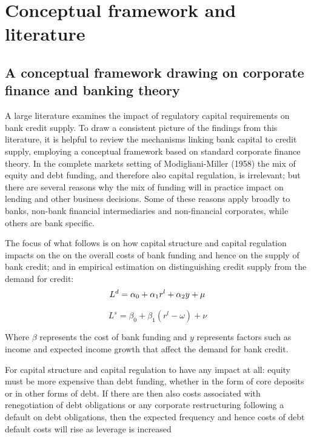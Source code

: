 \documentclass[
]{article}
\begin{document}
\hypertarget{conceptual-framework-and-literature}{%
\section{Conceptual framework and literature}\label{conceptual-framework-and-literature}}

\hypertarget{a-conceptual-framework-drawing-on-corporate-finance-and-banking-theory}{%
\subsection{A conceptual framework drawing on corporate finance and banking theory}\label{a-conceptual-framework-drawing-on-corporate-finance-and-banking-theory}}

A large literature examines the impact of regulatory capital requirements on bank credit supply. To draw a consistent picture of the findings from this literature, it is helpful to review the mechanisms linking bank capital to credit supply, employing a conceptual framework based on standard corporate finance theory. In the complete markets setting of Modigliani-Miller (1958) the mix of equity and debt funding, and therefore also capital regulation, is irrelevant; but there are several reasons why the mix of funding will in practice impact on lending and other business decisions. Some of these reasons apply broadly to banks, non-bank financial intermediaries and non-financial corporates, while others are bank specific.

The focus of what follows is on how capital structure and capital regulation impacts on the on the overall costs of bank funding and hence on the supply of bank credit; and in empirical estimation on distinguishing credit supply from the demand for credit:
\[
L^d =\alpha_0+\alpha_1 r^l+\alpha_2 y + \mu \label{loandemand1}\\
\]

\[
L^s =\beta_0+\beta_1 (r^l-\omega)+\nu \label{loansupply1}
\]

Where \(\beta\) represents the cost of bank funding and \(y\) represents factors such as income and expected income growth that affect the demand for bank credit.

For capital structure and capital regulation to have any impact at all: equity must be more expensive than debt funding, whether in the form of core deposits or in other forms of debt. If there are then also costs associated with renegotiation of debt obligations or any corporate restructuring following a default on debt obligations, then the expected frequency and hence costs of debt default costs will rise as leverage is increased
\end{document}
